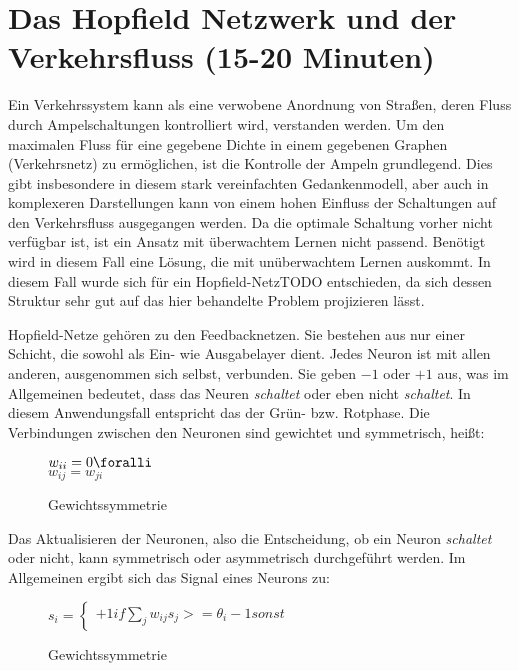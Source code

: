 \section*{Das Hopfield Netzwerk und der Verkehrsfluss (15-20 Minuten)}

Ein Verkehrssystem kann als eine verwobene Anordnung von Straßen, deren Fluss durch Ampelschaltungen kontrolliert wird, verstanden werden. Um den maximalen Fluss für eine gegebene Dichte in einem gegebenen Graphen (Verkehrsnetz) zu ermöglichen, ist die Kontrolle der Ampeln grundlegend. Dies gibt insbesondere in diesem stark vereinfachten Gedankenmodell, aber auch in komplexeren Darstellungen kann von einem hohen Einfluss der Schaltungen auf den Verkehrsfluss ausgegangen werden.
Da die optimale Schaltung vorher nicht verfügbar ist, ist ein Ansatz mit überwachtem Lernen nicht passend. Benötigt wird in diesem Fall eine Lösung, die mit unüberwachtem Lernen auskommt. In diesem Fall wurde sich für ein Hopfield-NetzTODO entschieden, da sich dessen Struktur sehr gut auf das hier behandelte Problem projizieren lässt.

Hopfield-Netze gehören zu den Feedbacknetzen. Sie bestehen aus nur einer Schicht, die sowohl als Ein- wie Ausgabelayer dient. Jedes Neuron ist mit allen anderen, ausgenommen sich selbst, verbunden. Sie geben \(-1\) oder \(+1\) aus, was im Allgemeinen bedeutet, dass das Neuren \textit{schaltet} oder eben nicht \textit{schaltet}. In diesem Anwendungsfall entspricht das der Grün- bzw. Rotphase.
Die Verbindungen zwischen den Neuronen sind gewichtet und symmetrisch, heißt:

\begin{figure}[H]
    \( w_{ii} = 0 \foralli \)\\
    \( w_{ij} = w_{ji} \)\\
    \caption{Gewichtssymmetrie}
    \label{func:weight_symmetry}
\end{figure}

Das Aktualisieren der Neuronen, also die Entscheidung, ob ein Neuron \textit{schaltet} oder nicht, kann symmetrisch oder asymmetrisch durchgeführt werden. Im Allgemeinen ergibt sich das Signal eines Neurons zu:

\begin{figure}[H]
    \( s_i =  \begin{cases}
    +1 if \sum_j w_{ij}s_j >= \theta_i
    -1 sonst\end{cases}\)
    \caption{Gewichtssymmetrie}
    \label{func:weight_symmetry}
\end{figure}

